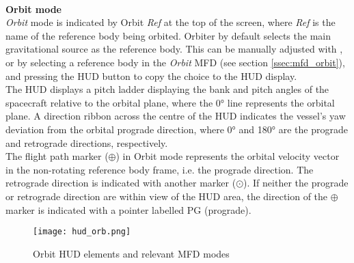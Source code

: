 \documentclass[Orbiter User Manual.tex]{subfiles}
\begin{document}
\noindent
\\
\textbf{Orbit mode}\\
\textit{Orbit} mode is indicated by Orbit \textit{Ref} at the top of the screen, where \textit{Ref} is the name of the reference body being orbited. Orbiter by default selects the main gravitational source as the reference body. This can be manually adjusted with \Ctrl{}, or by selecting a reference body in the \textit{Orbit} MFD (see section \ref{ssec:mfd_orbit}), and pressing the HUD button to copy the choice to the HUD display.\\
The HUD displays a pitch ladder displaying the bank and pitch angles of the spacecraft relative to the orbital plane, where the 0° line represents the orbital plane. A direction ribbon across the centre of the HUD indicates the vessel's yaw deviation from the orbital prograde direction, where 0° and 180° are the prograde and retrograde directions, respectively.\\
The flight path marker ($\oplus$) in Orbit mode represents the orbital velocity vector in the non-rotating reference body frame, i.e. the prograde direction. The retrograde direction is indicated with another marker ($\odot$). If neither the prograde or retrograde direction are within view of the HUD area, the direction of the $\oplus$ marker is indicated with a pointer labelled PG (prograde).

\begin{figure}[H]
  \centering
  \texttt{[image: hud\_orb.png]}
  \caption{Orbit HUD elements and relevant MFD modes}
\end{figure}
\end{document}
